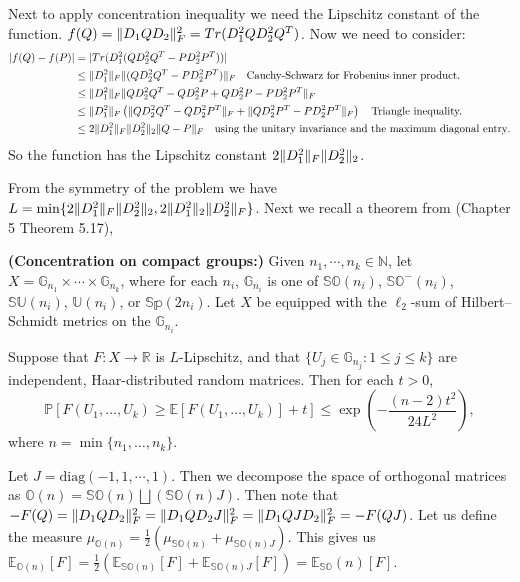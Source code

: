 \documentclass[onefignum,onetabnum]{siamart171218}
\DeclarePairedDelimiter\norm{\lVert}{\rVert}
\begin{document}
Next to apply concentration inequality we need the Lipschitz constant of the function.
$f(Q) = \norm{D_1 Q D_2}^2_F = Tr(D_1^2Q D_2^2 Q^T)$. 
Now we need to consider: 
\begin{align*}
   | f(Q) - f(P) | &= |Tr(D_1^2(Q D_2^2 Q^T - P D_2^2 P^T ))| \\
   & \leq \norm{D_1^2}_F \norm{(Q D_2^2 Q^T - P D_2^2 P^T )}_F \quad \text{Cauchy-Schwarz for Frobenius inner product.}\\
   & \leq \norm{D_1^2}_F \norm{Q D_2^2 Q^T - Q D_2^2 P + Q D_2^2 P- P D_2^2 P^T}_F \\
   &\leq \norm{D_1^2}_F \left(\norm{Q D_2^2 Q^T - Q D_2^2 P^T}_F + \norm{Q D_2^2 P^T- P D_2^2 P^T}_F \right) \quad \text{Triangle inequality.}\\
   & \leq 2 \norm{D_1^2}_F \norm{D_2^2}_2 \norm{Q-P}_F \quad \text{using the unitary invariance and the maximum diagonal entry}. 
\end{align*}
So the function has the Lipschitz constant $2 \norm{D_1^2}_F \norm{D_2^2}_2$.

From the symmetry of the problem we have $L = \min \{ 2 \norm{D_1^2}_F \norm{D_2^2}_2, 2 \norm{D_1^2}_2 \norm{D_2^2}_F \}$. Next we recall a theorem from \cite{meckes2019random} (Chapter 5 Theorem 5.17), 

\begin{theorem}\textbf{(Concentration on compact groups:)}\label{elizabeths}
Given $n_1, \cdots , n_k \in  \mathbb{N}$, let $X = \mathbb{G}_{n_1} \times \cdots \times \mathbb{G}_{n_k}$, where for each $n_i$, $\mathbb{G}_{n_i}$ is one of $\mathbb{SO}(n_i)$, $\mathbb{SO}^{-}(n_i)$, $\mathbb{SU}(n_i)$, $\mathbb{U}(n_i)$, or $\mathbb{Sp}(2n_i)$. Let $X$ be equipped with the $\ell_2$-sum of Hilbert--Schmidt metrics on the $\mathbb{G}_{n_i}$.

Suppose that $F : X \to \mathbb{R}$ is $L$-Lipschitz, and that $\{ U_j \in \mathbb{G}_{n_j} : 1 \leq j \leq k \}$ are independent, Haar-distributed random matrices. Then for each $t > 0$,
\[
\mathbb{P} \left[ F(U_1, \dots, U_k) \geq \mathbb{E}[F(U_1, \dots, U_k)] + t \right] 
\leq \exp\left( -\frac{(n - 2)t^2}{24L^2} \right),
\]
where $n = \min\{ n_1, \dots, n_k \}$.
\end{theorem}

 Let $J = \text{diag}(-1,1,\cdots ,1)$. Then we decompose the space of orthogonal matrices as $\mathbb{O}(n) = \mathbb{SO}(n) \bigsqcup (\mathbb{SO}(n)J)$. Then note that $-F(Q) = \norm{D_1 Q D_2}_F^2 = \norm{D_1 Q D_2 J}_F^2 = \norm{D_1 QJ D_2}_F^2 = -F(QJ)$. Let us define the measure $\mu_{\mathbb{O}(n)} = \frac{1}{2} \left( \mu_{\mathbb{SO}(n)}   +  \mu_{\mathbb{SO}(n) J} \right)$. This gives us $\mathbb{E}_{\mathbb{O}(n)}[F] = \frac{1}{2} \left( \mathbb{E}_{\mathbb{SO}(n)}[F]   +  \mathbb{E}_{\mathbb{SO}(n) J}[F] \right) = \mathbb{E}_\mathbb{SO}(n)[F]$.  
\end{document}
